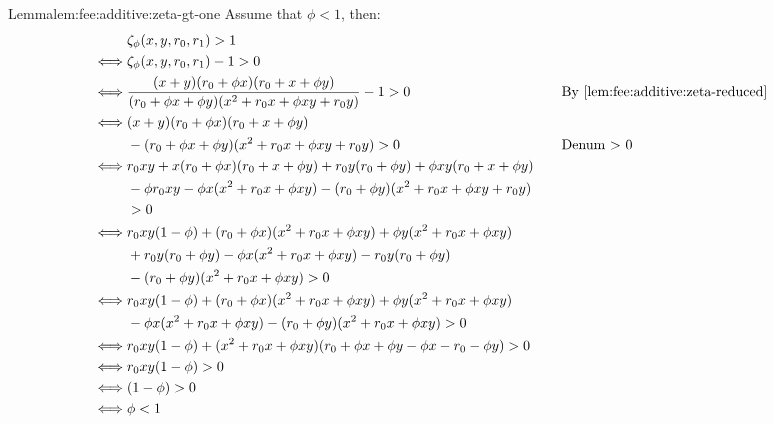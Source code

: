\begin{proofof}{Lemma}{lem:fee:additive:zeta-gt-one}
    Assume that $\phi < 1$, then: 
    \begin{align*}
        & \Z x y {r_0} {r_1} > 1 
        \\
        \iff & 
        \Z x y {r_0} {r_1} - 1 > 0
        \\
        \iff & 
        \frac
        {(x + y)(\ammR[0] + \fee x)(\ammR[0] + x + \fee y)}
        {(\ammR[0] + \fee x + \fee y)(x^2 + \ammR[0] x +\fee x y + \ammR[0] y)} 
        - 1 > 0 && \quad \text{By~\ref{lem:fee:additive:zeta-reduced}}
        \\
        \iff & 
        (x + y)(\ammR[0] + \fee x)(\ammR[0] + x + \fee y) 
        \\ & 
        - (\ammR[0] + \fee x + \fee y)(x^2 + \ammR[0] x +\fee x y + \ammR[0] y) > 0
        && \quad  \text{Denum > 0}
        \\
        \iff & 
        \ammR[0] x y + x(\ammR[0] + \fee x)(\ammR[0] + x + \fee y) + \ammR[0] y (\ammR[0] + \fee y) + \fee x y(\ammR[0] + x + \fee y) 
        \\ & 
        - \fee \ammR[0] x y - \fee x (x^2 + \ammR[0] x + \fee x y) - (\ammR[0] + \fee y) (x^2 + \ammR[0] x + \fee x y + \ammR[0] y)
        \\ & > 0
        \\
        \iff & 
        \ammR[0] x y (1 - \fee) + (\ammR[0] + \fee x)(x^2 + \ammR[0] x + \fee x y) + \fee y (x^2 + \ammR[0] x + \fee x y)
        \\ & 
        + \ammR[0] y (\ammR[0] + \fee y) - \fee x (x^2 + \ammR[0] x + \fee x y) - \ammR[0] y (\ammR[0] + \fee y) 
        \\ & 
        - (\ammR[0] + \fee y)(x^2 + \ammR[0] x + \fee x y) > 0
        \\ 
        \iff &
        \ammR[0] x y (1 - \fee) + (\ammR[0] + \fee x)(x^2 + \ammR[0] x + \fee x y) + \fee y (x^2 + \ammR[0] x + \fee x y)
        \\  & 
        - \fee x (x^2 + \ammR[0] x + \fee x y) - (\ammR[0] + \fee y)(x^2 + \ammR[0] x + \fee x y) > 0
        \\
        \iff & 
        \ammR[0] x y (1 - \fee) + (x^2 + \ammR[0] x + \fee x y)(\ammR[0] + \fee x + \fee y - \fee x - \ammR[0] - \fee y) > 0
        \\
        \iff & 
        \ammR[0] x y (1 - \fee) > 0
        \\ 
        \iff & (1 - \fee) > 0
        \\
        \iff & 
        \fee < 1
    \end{align*}
\end{proofof}

